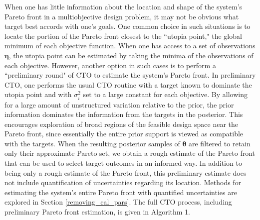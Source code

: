 \documentclass[twocolumn,10pt]{asme2ej}
\begin{document}
%
When one has little information about the location and shape of the system's Pareto front in a multiobjective design problem, it may not be obvious what target best accords with one's goals.
%
One common choice in such situations is to locate the portion of the Pareto front closest to the ``utopia point," the global minimum of each objective function.
%
When one has access to a set of observations $\boldsymbol\eta$, the utopia point can be estimated by taking the minima of the observations of each objective.
%
However, another option in such cases is to perform a ``preliminary round" of CTO to estimate the system's Pareto front.
%
In preliminary CTO, one performs the usual CTO routine with a target known to dominate the utopia point and with $\sigma_i^2$ set to a large constant for each objective.
%
By allowing for a large amount of unstructured variation relative to the prior, the prior information dominates the information from the targets in the posterior. This encourages exploration of broad regions of the feasible design space near the Pareto front, since essentially the entire prior support is viewed as compatible with the targets.
%
When the resulting posterior samples of $\boldsymbol\theta$ are filtered to retain only their approximate Pareto set, we obtain a rough estimate of the Pareto front that can be used to select target outcomes in an informed way.
%
In addition to being only a rough estimate of the Pareto front, this preliminary estimate does not include quantification of uncertainties regarding its location.
%
Methods for estimating the system's entire Pareto front with quantified uncertainties are explored in Section \ref{removing_cal_pars}.
%
The full CTO process, including preliminary Pareto front estimation, is given in Algorithm 1.
\end{document}
